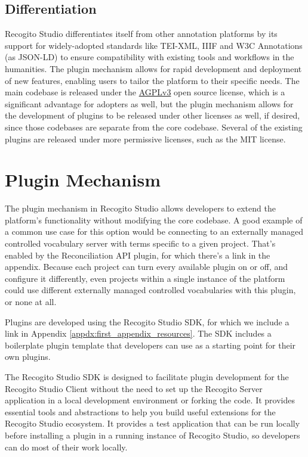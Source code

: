 \documentclass[final]{anthology-ch}         %
\begin{document}
\subsection{Differentiation} \label{sec:overview_differentiation}
Recogito Studio differentiates itself from other annotation platforms by its support for widely-adopted standards like TEI-XML, IIIF and W3C Annotations (as JSON-LD) to ensure compatibility with existing tools and workflows in the humanities. The plugin mechanism allows for rapid development and deployment of new features, enabling users to tailor the platform to their specific needs. The main codebase is released under the \href{https://choosealicense.com/licenses/agpl-3.0/}{AGPLv3} open source license, which is a significant advantage for adopters as well, but the plugin mechanism allows for the development of plugins to be released under other licenses as well, if desired, since those codebases are separate from the core codebase. Several of the existing plugins are released under more permissive licenses, such as the MIT license.

\section{Plugin Mechanism}

The plugin mechanism in Recogito Studio allows developers to extend the platform's functionality without modifying the core codebase. A good example of a common use case for this option would be connecting to an externally managed controlled vocabulary server with terms specific to a given project. That's enabled by the Reconciliation API plugin, for which there's a link in the appendix. Because each project can turn every available plugin on or off, and configure it differently, even projects within a single instance of the platform could use different externally managed controlled vocabularies with this plugin, or none at all.

Plugins are developed using the Recogito Studio SDK, for which we include a link in Appendix \ref{appdx:first_appendix_resources}. The SDK includes a boilerplate plugin template that developers can use as a starting point for their own plugins.

The Recogito Studio SDK is designed to facilitate plugin development for the Recogito Studio Client without the need to set up the Recogito Server application in a local development environment or forking the code. It provides essential tools and abstractions to help you build useful extensions for the Recogito Studio ecosystem. It provides a test application that can be run locally before installing a plugin in a running instance of Recogito Studio, so developers can do most of their work locally.
\end{document}

